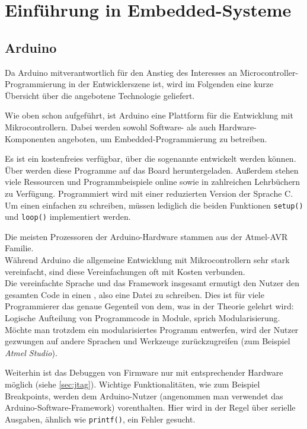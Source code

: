 \section{Einführung in Embedded-Systeme}
		\subsection{Arduino}
		\label{sec:arduino}
		Da Arduino mitverantwortlich für den Anstieg des Interesses an Microcontroller-Programmierung in der
		Entwicklerszene ist, wird im Folgenden eine kurze Übersicht über die angebotene Technologie geliefert.

		Wie oben schon aufgeführt, ist Arduino eine Plattform für die Entwicklung mit Mikrocontrollern. Dabei werden
		sowohl Software- als auch Hardware-Komponenten angeboten, um Embedded-Programmierung zu betreiben.

		Es ist ein kostenfreies  verfügbar, über die sogenannte  entwickelt
		werden können. Über  werden diese Programme auf das Board heruntergeladen.
	    Außerdem stehen viele Ressourcen und Programmbeispiele online sowie in zahlreichen Lehrbüchern zu Verfügung.
	    Programmiert wird mit einer reduzierten Version der Sprache C. Um einen einfachen  zu schreiben,
	    müssen lediglich die beiden Funktionen \texttt{setup()} und \texttt{loop()} implementiert werden.

        Die meisten Prozessoren der Arduino-Hardware stammen aus der Atmel-AVR Familie.
        \\

	    Während Arduino die allgemeine Entwicklung mit Mikrocontrollern sehr stark vereinfacht, sind diese
	    Vereinfachungen oft mit Kosten verbunden.
	    \\

	    Die vereinfachte Sprache und das Framework insgesamt ermutigt den Nutzer den gesamten Code in einen , also
	    eine Datei zu schreiben. Dies ist für viele Programmierer das genaue Gegenteil von dem, was in der Theorie
	    gelehrt wird: Logische Aufteilung von Programmcode in Module, sprich Modularisierung.
	    Möchte man trotzdem ein modularisiertes Programm entwerfen, wird der Nutzer gezwungen auf andere Sprachen und
	    Werkzeuge zurückzugreifen (zum Beispiel \textit{Atmel Studio}).

		Weiterhin ist das Debuggen von Firmware nur mit entsprechender Hardware möglich (siehe \ref{sec:jtag}). Wichtige
		Funktionalitäten, wie zum Beispiel Breakpoints, werden dem Arduino-Nutzer (angenommen man verwendet das
		Arduino-Software-Framework) vorenthalten. Hier wird in der Regel über serielle Ausgaben, ähnlich wie \texttt{printf()},
		ein Fehler gesucht.

